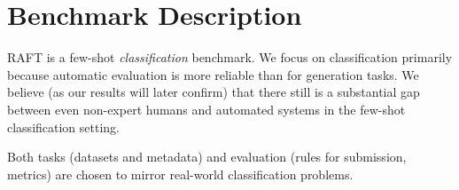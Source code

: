 \documentclass{article}
\newcommand{\name}{\textsc{RAFT}}
\begin{document}
\begin{comment}

Additional refs to consider:

- han_2021: Ptr: Prompt tuning with rules for text classification

- hendrycks_2020: Dan Hendrycks, Collin Burns, Collin Burns, Steven Basart, Andy Zou, Mantas Mazeika, Dawn Song, and Jacob Steinhardt. Measuring massive multitask language understanding.

- hendrycks_2021: Dan Hendrycks, Collin Burns, Saurav Kadavath, Akul Arora, Steven Basart, Eric Tang, Dawn Song, and Jacob Steinhardt.  Measuring mathematical problem solving with the math dataset.

- minaee_2021: Deep learning based text classification: A comprehensive review.

- schick_2020: Few shot text generation with pattern exploiting training.

- min_2021: sewon min, michael lewis, hannaneh hajishirzi, and luke zettlemoyer. Noisy channel language model prompting for few shot text classification.

- xu_2021: Liang Xu, Xiaojing Lu, Chenyang Yuan, Xuanwei Zhang, Hu Yuan, Huilin Xu, Guoao Wei, Xiang Pan, and Hai Hu. Fewclue: A chinese few-shot learning evaluation benchmark.

- Hou2020FewJointAF: FewJoint: A Few-shot Learning Benchmark for Joint Language Understanding

Trapit Bansal, Rishikesh Jha, and Andrew McCallum. 2020. Learning to Few-Shot Learn Across Diverse Natural Language Classification Tasks. In COLING

\end{comment}



\section{Benchmark Description}

\name{} is a few-shot {\em classification} benchmark. We focus on classification primarily because automatic evaluation is more reliable than for generation tasks. We believe (as our results will later confirm) that there still is a substantial gap between even non-expert humans and automated systems in the few-shot classification setting.

Both tasks (datasets and metadata) and evaluation (rules for submission, metrics) are chosen to mirror real-world classification problems.
\end{document}
